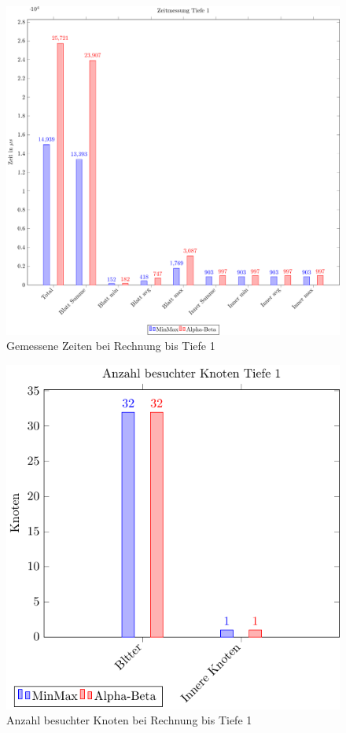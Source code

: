    \begin{figure}[h]
      \centering
      \includegraphics[width=\textwidth]{figures/time-1.pdf} 
      \caption{Gemessene Zeiten bei Rechnung bis Tiefe 1}
      \label{fig:time-1}
    \end{figure}
    \begin{figure}[h]
      \centering
      \includegraphics[width=\textwidth]{figures/node-1.pdf} 
      \caption{Anzahl besuchter Knoten bei Rechnung bis Tiefe 1}
      \label{fig:node-1}
    \end{figure}
    
